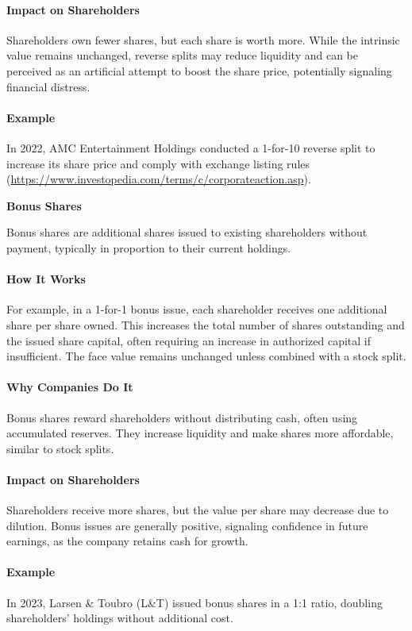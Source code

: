 \documentclass[12pt]{article}
\begin{document}
\paragraph{Impact on Shareholders}
Shareholders own fewer shares, but each share is worth more. While the intrinsic value remains unchanged, reverse splits may reduce liquidity and can be perceived as an artificial attempt to boost the share price, potentially signaling financial distress.

\paragraph{Example}
In 2022, AMC Entertainment Holdings conducted a 1-for-10 reverse split to increase its share price and comply with exchange listing rules (\url{https://www.investopedia.com/terms/c/corporateaction.asp}).

\textbf{Bonus Shares}

Bonus shares are additional shares issued to existing shareholders without payment, typically in proportion to their current holdings.

\paragraph{How It Works}
For example, in a 1-for-1 bonus issue, each shareholder receives one additional share per share owned. This increases the total number of shares outstanding and the issued share capital, often requiring an increase in authorized capital if insufficient. The face value remains unchanged unless combined with a stock split.

\paragraph{Why Companies Do It}
Bonus shares reward shareholders without distributing cash, often using accumulated reserves. They increase liquidity and make shares more affordable, similar to stock splits.

\paragraph{Impact on Shareholders}
Shareholders receive more shares, but the value per share may decrease due to dilution. Bonus issues are generally positive, signaling confidence in future earnings, as the company retains cash for growth.

\paragraph{Example}
In 2023, Larsen \& Toubro (L\&T) issued bonus shares in a 1:1 ratio, doubling shareholders' holdings without additional cost.
\end{document}
